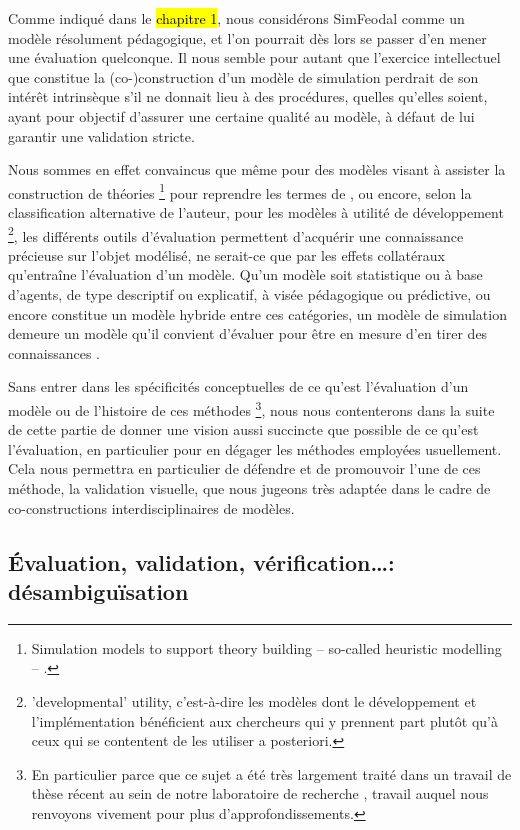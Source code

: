 Comme indiqué dans le \hl{chapitre 1}, nous considérons SimFeodal comme un modèle résolument pédagogique, et l'on pourrait dès lors se passer d'en mener une évaluation quelconque.
Il nous semble pour autant que l'exercice intellectuel que constitue la (co-)construction d'un modèle de simulation perdrait de son intérêt intrinsèque s'il ne donnait lieu à des procédures, quelles qu'elles soient, ayant pour objectif d'assurer une certaine qualité au modèle, à défaut de lui garantir une validation stricte.

Nous sommes en effet convaincus que même pour des modèles visant à \og assister la construction de théories\fg{}
\footnote{
	\og Simulation models to support theory building -- so-called heuristic modelling -- \textelp{}.\fg{}
} pour reprendre les termes de \textcite[260]{lake_trends_2014}, ou encore, selon la classification alternative de l'auteur, pour les modèles à utilité \og de développement\fg{}
\footnote{
	\og 'developmental' utility\fg{}, c'est-à-dire les modèles dont le développement et l'implémentation bénéficient aux chercheurs qui y prennent part plutôt qu'à ceux qui se contentent de les utiliser a posteriori.
}, les différents outils d'évaluation permettent d'acquérir une connaissance précieuse sur l'objet modélisé, ne serait-ce que par les effets collatéraux qu'entraîne l'évaluation d'un modèle.
Qu'un modèle soit statistique ou à base d'agents, de type descriptif ou explicatif, à visée pédagogique ou prédictive, ou encore constitue un modèle \og hybride\fg{} entre ces catégories, un modèle de simulation demeure un modèle qu'il convient d'évaluer pour être en mesure d'en tirer des connaissances \autocite[299-300]{sargent_history_2017}.

Sans entrer dans les spécificités conceptuelles de ce qu'est l'évaluation d'un modèle ou de l'histoire de ces méthodes
\footnote{
	En particulier parce que ce sujet a été très largement traité dans un travail de thèse récent au sein de notre laboratoire de recherche \autocite[pp. 58--184]{rey-coyrehourcq_plateforme_2015}, travail auquel nous renvoyons vivement pour plus d'approfondissements.
}, nous nous contenterons dans la suite de cette partie de donner une vision aussi succincte que possible de ce qu'est l'évaluation, en particulier pour en dégager les méthodes employées usuellement.
Cela nous permettra en particulier de défendre et de promouvoir l'une de ces méthode, la validation visuelle, que nous jugeons très adaptée dans le cadre de co-constructions interdisciplinaires de modèles.

\subsection{Évaluation, validation, vérification\ldots : désambiguïsation}

